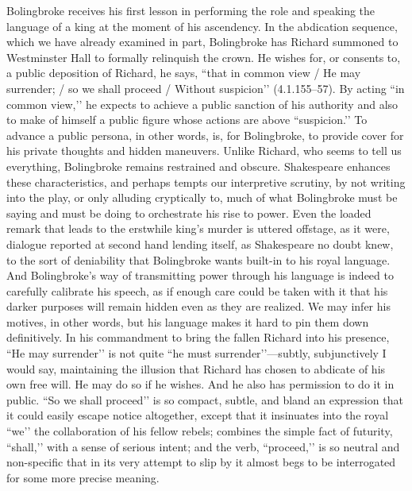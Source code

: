 Bolingbroke receives his first lesson in performing the role and speaking the language of a king at the moment of his ascendency.
In the abdication sequence, which we have already examined in part, Bolingbroke has Richard summoned to Westminster Hall to formally relinquish the crown.
He wishes for, or consents to, a public deposition of Richard, he says, ``that in common view / He may surrender; / so we shall proceed / Without suspicion’’ (4.1.155--57).
By acting ``in common view,’’ he expects to achieve a public sanction of his authority and also to make of himself a public figure whose actions are above ``suspicion.’’ To advance a public persona, in other words, is, for Bolingbroke, to provide cover for his private thoughts and hidden maneuvers.
Unlike Richard, who seems to tell us everything, Bolingbroke remains restrained and obscure.
Shakespeare enhances these characteristics, and perhaps tempts our interpretive scrutiny, by not writing into the play, or only alluding cryptically to, much of what Bolingbroke must be saying and must be doing to orchestrate his rise to power.
Even the loaded remark that leads to the erstwhile king’s murder is uttered offstage, as it were, dialogue reported at second hand lending itself, as Shakespeare no doubt knew, to the sort of deniability that Bolingbroke wants built-in to his royal language.
And Bolingbroke’s way of transmitting power through his language is indeed to carefully calibrate his speech, as if enough care could be taken with it that his darker purposes will remain hidden even as they are realized.
We may infer his motives, in other words, but his language makes it hard to pin them down definitively.
In his commandment to bring the fallen Richard into his presence, ``He may surrender’’ is not quite ``he must surrender’’---subtly, subjunctively I would say, maintaining the illusion that Richard has chosen to abdicate of his own free will.
He may do so if he wishes.
And he also has permission to do it in public.
``So we shall proceed’’ is so compact, subtle, and bland an expression that it could easily escape notice altogether, except that it insinuates into the royal ``we’’ the collaboration of his fellow rebels; combines the simple fact of futurity, ``shall,’’ with a sense of serious intent; and the verb, ``proceed,’’ is so neutral and non-specific that in its very attempt to slip by it almost begs to be interrogated for some more precise meaning.

